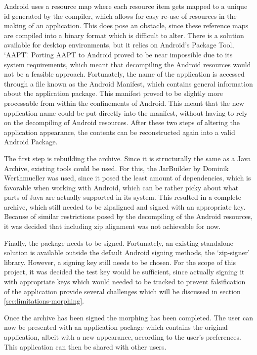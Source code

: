 Android uses a resource map where each resource item gets mapped to a unique id generated by the compiler, which allows for easy re-use of resources in the making of an application.
This does pose an obstacle, since these reference maps are compiled into a binary format which is difficult to alter.
There is a solution available for desktop environments\cite{website:apktool}, but it relies on Android's Package Tool, `AAPT'.
Porting AAPT to Android proved to be near impossible due to its system requirements, which meant that decompiling the Android resources would not be a feasible approach.
Fortunately, the name of the application is accessed through a file known as the Android Manifest, which contains general information about the application package.
This manifest proved to be slightly more processable from within the confinements of Android.
This meant that the new application name could be put directly into the manifest, without having to rely on the decompiling of Android resources.
After these two steps of altering the application appearance, the contents can be reconstructed again into a valid Android Package.

The first step is rebuilding the archive. 
Since it is structurally the same as a Java Archive, existing tools could be used. 
For this, the JarBuilder by Dominik Werthmueller\cite{website:jarbuilder} was used, since it posed the least amount of dependencies, which is favorable when working with Android, which can be rather picky about what parts of Java are actually supported in its system.
This resulted in a complete archive, which still needed to be zipaligned and signed with an appropriate key.
Because of similar restrictions posed by the decompiling of the Android resources, it was decided that including zip alignment was not achievable for now.

Finally, the package needs to be signed. 
Fortunately, an existing standalone solution is available outside the default Android signing methods, the `zip-signer' library\cite{website:zip-signer}.
However, a signing key still needs to be chosen. 
For the scope of this project, it was decided the test key would be sufficient, since actually signing it with appropriate keys which would needed to be tracked to prevent falsification of the application provide several challenges which will be discussed in section \ref{sec:limitations-morphing}.

Once the archive has been signed the morphing has been completed. 
The user can now be presented with an application package which contains the original application, albeit with a new appearance, according to the user's preferences.
This application can then be shared with other users.


